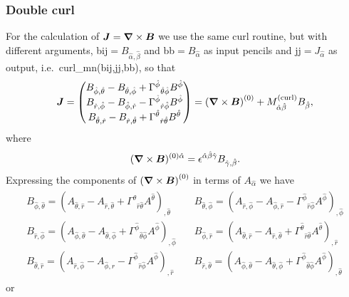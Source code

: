 \documentclass[\mydriver,12pt,twoside,notitlepage,a4paper]{article}
\renewcommand{\vec}[1]{\mbox{\boldmath{$#1$}}}
\newcommand{\Bv}            {\vec{B}}
\newcommand{\Jv}            {\vec{J}}
\newcommand{\nab}{\mbox{\boldmath $\nabla$} {}}
\begin{document}
\subsubsection{Double curl}

For the calculation of $\Jv=\nab\times\Bv$ we use the same
curl routine, but with different arguments,
{\sf bij}$=B_{\hat\alpha,\hat\beta}$ and {\sf bb}$=B_{\hat\alpha}$
as input pencils and {\sf jj}$=J_{\hat\alpha}$ as output,
i.e.\ {\sf curl\_mn(bij,jj,bb)}, so that
\begin{equation}
\Jv=
\begin{pmatrix}
B_{\hat\phi,\hat\theta}-B_{\hat\theta,\hat\phi}
  +{\Gamma^{\hat\phi}}_{\hat\theta\hat\phi}B^{\hat\phi}\cr
B_{\hat r,\hat\phi}-B_{\hat\phi,\hat r}
  -{\Gamma^{\hat\phi}}_{\hat r\hat\phi}B^{\hat\phi}\cr
B_{\hat\theta,\hat r}-B_{\hat r,\hat\theta}
  +{\Gamma^{\hat\theta}}_{\hat r\hat\theta}B^{\hat\theta}
\end{pmatrix}
=\left(\nab\times\Bv\right)^{(0)}
+M^{\rm(curl)}_{\hat\alpha\hat\beta}B_{\hat\beta},
\end{equation}
where
\begin{equation}
(\nab\times\Bv)^{(0) \hat\alpha}
=\epsilon^{\hat\alpha\hat\beta\hat\gamma}B_{\hat\gamma,\hat\beta}.
\end{equation}
Expressing the components of $\left(\nab\times\Bv\right)^{(0)}$ in terms
of $A_{\hat\alpha}$ we have
\begin{eqnarray}
\begin{array}{lll}
B_{\hat\phi,\hat\theta}=
(A_{\hat\theta,\hat r}-A_{\hat r,\hat\theta}+{\Gamma^{\hat\theta}}_{\hat r\hat\theta}A^{\hat\theta})_{,\hat\theta}
\quad&
B_{\hat\theta,\hat\phi}=
(A_{\hat r,\hat\phi}-A_{\hat\phi,\hat r}-{\Gamma^{\hat\phi}}_{\hat r\hat\phi}A^{\hat\phi})_{,\hat\phi}
\\
B_{\hat r,\hat\phi}=
(A_{\hat\phi,\hat\theta}-A_{\hat\theta,\hat\phi}+{\Gamma^{\hat\phi}}_{\hat\theta\hat\phi}A^{\hat\phi})_{,\hat\phi}
\quad&
B_{\hat\phi,\hat r}=
(A_{\hat\theta,\hat r}-A_{\hat r,\hat\theta}+{\Gamma^{\hat\theta}}_{\hat r\hat\theta}A^{\hat\theta})_{,\hat r}
\\
B_{\hat\theta,\hat r}=
(A_{\hat r,\hat\phi}-A_{\hat\phi,\hat r}-{\Gamma^{\hat\phi}}_{\hat r\hat\phi}A^{\hat\phi})_{,\hat r}
\quad&
B_{\hat r,\hat\theta}=
(A_{\hat\phi,\hat\theta}-A_{\hat\theta,\hat\phi}+{\Gamma^{\hat\phi}}_{\hat\theta\hat\phi}A^{\hat\phi})_{,\hat\theta}
\end{array}
\end{eqnarray}
or
\end{document}
